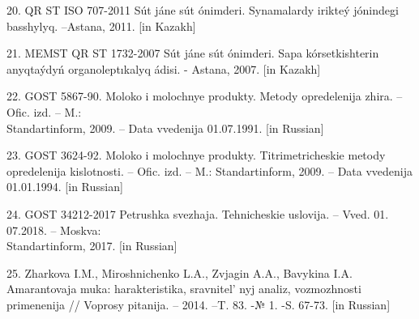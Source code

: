 \begin{references}
20. QR ST ISO 707-2011 Sút jáne sút ónimderi. Synamalardy irikteý
jónindegi basshylyq. --Astana, 2011. {[}in Kazakh{]}

21. MEMST QR ST 1732-2007 Sút jáne sút ónimderi. Sapa kórsetkishterin
anyqtaýdyń organoleptıkalyq ádisi. - Astana, 2007. {[}in Kazakh{]}

22. GOST 5867-90. Moloko i molochnye produkty. Metody opredelenija zhira.
-- Ofic. izd. -- M.: \\Standartinform, 2009. -- Data vvedenija 01.07.1991.
{[}in Russian{]}

23. GOST 3624-92. Moloko i molochnye produkty. Titrimetricheskie metody
opredelenija kislotnosti. -- Ofic. izd. -- M.: Standartinform, 2009. --
Data vvedenija 01.01.1994. {[}in Russian{]}

24. GOST 34212-2017 Petrushka svezhaja. Tehnicheskie uslovija. -- Vved.
01. 07.2018. -- Moskva: \\Standartinform, 2017. {[}in Russian{]}

25. Zharkova I.M., Miroshnichenko L.A., Zvjagin A.A., Bavykina I.A.
Amarantovaja muka: harakteristika, sravnitel' nyj analiz,
vozmozhnosti primenenija // Voprosy pitanija. -- 2014. --T. 83. -№ 1.
-S. 67-73. {[}in Russian{]}
\end{references}

